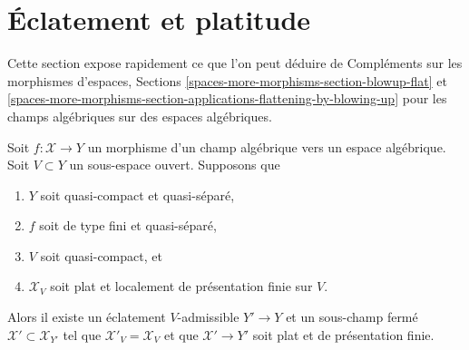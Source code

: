 \section{Éclatement et platitude}
\label{section-blowup-flat}

\noindent
Cette section expose rapidement ce que l'on peut déduire de
Compléments sur les morphismes d'espaces, Sections
\ref{spaces-more-morphisms-section-blowup-flat} et
\ref{spaces-more-morphisms-section-applications-flattening-by-blowing-up}
pour les champs algébriques sur des espaces algébriques.

\begin{lemma}
\label{lemma-flatten-stack}
Soit $f : \mathcal{X} \to Y$ un morphisme d'un champ algébrique
vers un espace algébrique. Soit $V \subset Y$ un sous-espace ouvert. Supposons que
\begin{enumerate}
\item $Y$ soit quasi-compact et quasi-séparé,
\item $f$ soit de type fini et quasi-séparé,
\item $V$ soit quasi-compact, et
\item $\mathcal{X}_V$ soit plat et localement de présentation finie sur $V$.
\end{enumerate}
Alors il existe un éclatement $V$-admissible $Y' \to Y$
et un sous-champ fermé $\mathcal{X}' \subset \mathcal{X}_{Y'}$
tel que $\mathcal{X}'_V = \mathcal{X}_V$ et que
$\mathcal{X}' \to Y'$ soit plat et de présentation finie.
\end{lemma}

